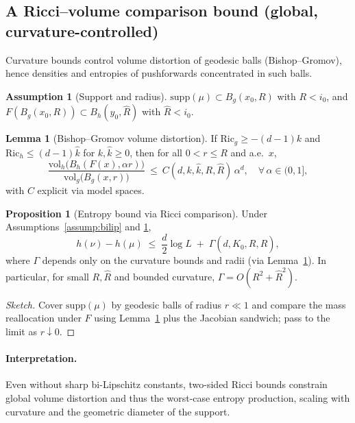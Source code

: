 \documentclass{article}
\theoremstyle{definition}
\newtheorem{assumption}{Assumption}[section]
\newtheorem{lemma}[theorem]{Lemma}
\newtheorem{proposition}[theorem]{Proposition}
\begin{document}
\subsection{A Ricci--volume comparison bound (global, curvature-controlled)}

Curvature bounds control volume distortion of geodesic balls (Bishop--Gromov),
hence densities and entropies of pushforwards concentrated in such balls.

\begin{assumption}[Support and radius]
\label{assump:support}
\(\mathrm{supp}(\mu)\subset B_g(x_0,R)\) with \(R<i_0\), and
\(F(B_g(x_0,R))\subset B_h(y_0,\widehat R)\) with \(\widehat R<i_0\).
\end{assumption}

\begin{lemma}[Bishop--Gromov volume distortion]
\label{lem:BG}
If \(\mathrm{Ric}_g\ge -(d-1)k\) and \(\mathrm{Ric}_h\le (d-1)\widehat k\) for \(k,\widehat k\ge 0\),
then for all \(0<r\le R\) and a.e.\ \(x\),
\[
\frac{\mathrm{vol}_h\big(B_h(F(x),\alpha r)\big)}{\mathrm{vol}_g\big(B_g(x,r)\big)}
\ \le\ C(d,k,\widehat k,R,\widehat R)\,\alpha^d,
\quad \forall\,\alpha\in(0,1],
\]
with \(C\) explicit via model spaces.
\end{lemma}

\begin{proposition}[Entropy bound via Ricci comparison]
\label{prop:entropy-ricci}
Under Assumptions~\ref{assump:bilip} and \ref{assump:support},
\[
h(\nu) - h(\mu) \;\le\; \frac{d}{2}\log L \;+\; \Gamma(d,K_0,R,\widehat R),
\]
where \(\Gamma\) depends only on the curvature bounds and radii (via
Lemma~\ref{lem:BG}). In particular, for small \(R,\widehat R\) and bounded
curvature, \(\Gamma = O(R^2+\widehat R^2)\).
\end{proposition}

\begin{proof}[Sketch]
Cover \(\mathrm{supp}(\mu)\) by geodesic balls of radius \(r\ll 1\) and compare the
mass reallocation under \(F\) using Lemma~\ref{lem:BG} plus the Jacobian
sandwich; pass to the limit as \(r\downarrow 0\).
\end{proof}

\paragraph{Interpretation.}
Even without sharp bi-Lipschitz constants, two-sided Ricci bounds constrain
global volume distortion and thus the worst-case entropy production, scaling
with curvature and the geometric diameter of the support.
\end{document}
